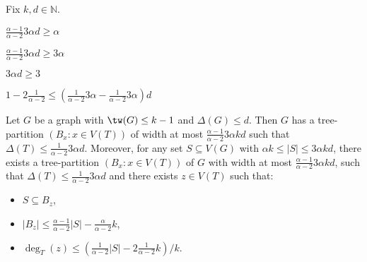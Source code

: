 \begin{lem}
Fix $k,d\in\mathbb{N}$. 

 $\frac{\alpha-1}{\alpha-2}  3 \alpha   d \geq \alpha $
 
 $\frac{\alpha-1}{\alpha-2}  3 \alpha   d\geq 3 \alpha  $
 
 $3 \alpha   d\geq 3$ 

$1- 2 \frac{1}{\alpha-2}   \leq (\frac{1}{\alpha-2} 3 \alpha   -\frac{1}{\alpha-2} 3 \alpha  )d$ 


Let $G$ be a graph with $\tw(G)\leq k-1$ and $\Delta(G)\leq d$.
Then $G$ has a tree-partition $(B_x:x\in V(T))$ of width at most $\frac{\alpha-1}{\alpha-2}  3 \alpha   kd$ such that $\Delta(T)\leq \frac{1}{\alpha-2} 3 \alpha    d$. 
Moreover, for any set $S\subseteq V(G)$ with $\alpha  k\leq|S| \leq 3 \alpha   kd$, there exists a tree-partition $(B_x:x\in V(T))$ of $G$ with width at most $\frac{\alpha-1}{\alpha-2}  3 \alpha    kd$, such that $\Delta(T)\leq \frac{1}{\alpha-2} 3 \alpha   d$ and there exists $z\in V(T)$ such that:
\begin{itemize}
    \item $S\subseteq B_z$, 
    \item $|B_z|\leq \frac{\alpha-1}{\alpha-2} |S|- \frac{\alpha}{\alpha-2} k$,
    \item $\deg_T(z)\leq ( \frac{1}{\alpha-2} |S| - 2 \frac{1}{\alpha-2}  k)/k$.
\end{itemize}
\end{lem}


